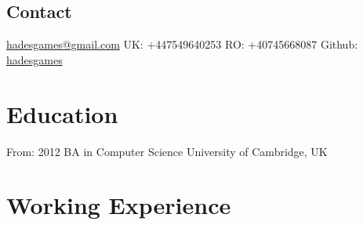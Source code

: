 \documentclass[]{friggeri-cv}
\begin{document}
       {}

\begin{aside}
  \section{Contact}
    \href{mailto:hadesgames@gmail.com}{hadesgames@gmail.com}
    UK: +447549640253
    RO: +40745668087
    Github: \href{http://github.com/hadesgames}{hadesgames}
\end{aside}


\section{Education}

\begin{entrylist}
  \entry
    {From: 2012}
    {}
    {BA in Computer Science}
    {}
    {University of Cambridge, UK}
   
\end{entrylist}

\section{Working Experience}
\end{document}

